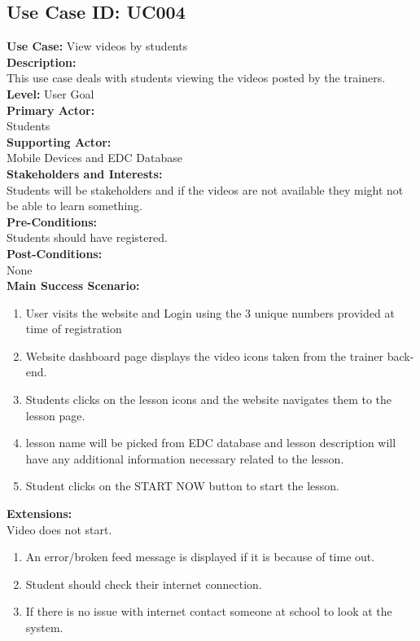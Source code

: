 \documentclass{report}
\begin{document}
\subsection{\textbf{Use Case ID:} UC004}
\textbf{Use Case:} View videos by students\\[0.3cm]
\textbf{Description:}\\
This use case deals with students viewing the videos posted by the trainers.\\[0.3cm]
\textbf{Level:} User Goal\\[0.3cm]
\textbf{Primary Actor:}\\
Students\\[0.3cm]
\textbf{Supporting Actor:}\\
Mobile Devices and EDC Database\\[0.3cm]
\textbf{Stakeholders and Interests:}\\
Students will be stakeholders and if the videos are not available they might not be able to learn something.\\[0.3cm]
\textbf{Pre-Conditions:}\\
Students should have registered.\\[0.3cm]
\textbf{Post-Conditions:}\\
None\\[0.3cm]
\textbf{\large {Main Success Scenario:}}
\begin{enumerate}
    \item User visits the website and Login using the 3 unique numbers provided at time of registration
    \item Website dashboard page displays the video icons taken from the trainer back-end.
    \item Students clicks on the lesson icons and the website navigates them to the lesson page.
    \item lesson name will be picked from EDC database and lesson description will have any additional information necessary related to the lesson.
    \item Student clicks on the START NOW button to start the lesson.
\end{enumerate}
\textbf{Extensions:}\\
Video does not start.
\begin{enumerate}
    \item An error/broken feed message is displayed if it is because of time out.
    \item Student should check their internet connection.
    \item If there is no issue with internet contact someone at school to look at the system.
\end{enumerate}
\end{document}
